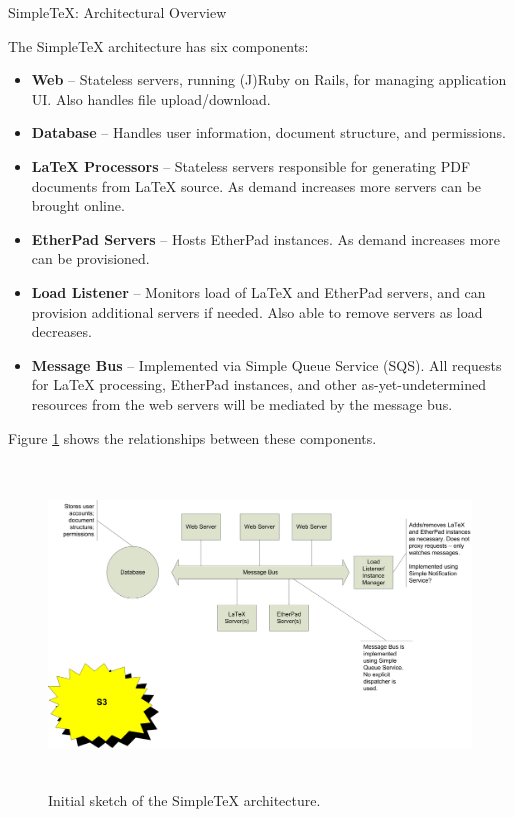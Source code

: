 \documentclass[11pt]{article}
\newcommand\STex{Simple\TeX\xspace}
\newcommand\LTex{\LaTeX\xspace}
\begin{document}
\thispagestyle{first}
\begin{center}
\Huge{\STex: Architectural Overview}
\end{center}

The \STex architecture has six components:

\begin{itemize}
\item \textbf{Web} -- Stateless servers, running (J)Ruby on Rails, for managing application UI. Also handles file upload/download.
\item \textbf{Database} -- Handles user information, document structure, and permissions.
\item \textbf{\LTex Processors} -- Stateless servers responsible for generating PDF documents from \LTex source. As demand increases more servers can be brought online.
\item \textbf{EtherPad Servers} -- Hosts EtherPad instances. As demand increases more can be provisioned.
\item \textbf{Load Listener} -- Monitors load of \LTex and EtherPad servers, and can provision additional servers if needed. Also able to remove servers as load decreases.
\item \textbf{Message Bus} -- Implemented via Simple Queue Service (SQS). All requests for \LTex processing, EtherPad instances, and other as-yet-undetermined resources from the web servers will be mediated by the message bus.
\end{itemize}

Figure \ref{fig_arch} shows the relationships between these components.

\begin{figure}[h]
\centering
\includegraphics[width=6in,height=3.3738in]{SimpleTexArchitectureDiagram}
\caption{Initial sketch of the \STex architecture.}
\label{fig_arch}
\end{figure}
\end{document}
